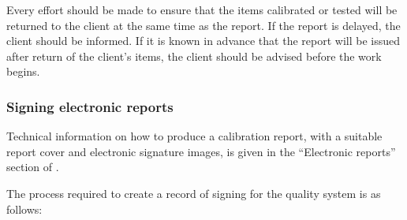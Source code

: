 Every effort should be made to ensure that the items calibrated or tested will be returned to the client at the same time as the report. If the report is delayed, the client should be informed. If it is known in advance that the report will be issued after return of the client’s items, the client should be advised before the work begins.

\subsubsection{Signing electronic reports}
\label{sss:electronic_signatures}
Technical information on how to produce a calibration report, with a suitable report cover and electronic signature images, is given in the ``Electronic reports''  section of \cite[\S\ref*{GRP-ss:electronic_reports}]{MSL_Reporting_Guidelines}.

The process required to create a record of signing for the quality system is as follows:

